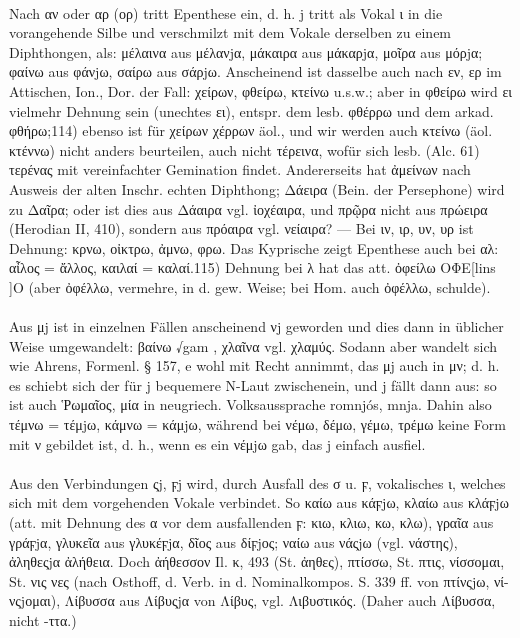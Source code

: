   \paragraph{} Nach αν
  oder αρ (ορ) tritt Epenthese ein, d. h. j tritt als Vokal ι in die
  vorangehende Silbe und verschmilzt mit dem Vokale derselben zu einem
  Diphthongen, als: μέλαινα aus μέλανjα, μάκαιρα aus μάκαρjα, μοῖρα aus μόρjα;
  φαίνω aus φάνjω, σαίρω aus σάρjω. Anscheinend ist dasselbe auch nach εν, ερ im
  Attischen, Ion., Dor. der Fall: χείρων, φθείρω, κτείνω u.s.w.; aber in
  φθείρω wird ει vielmehr Dehnung sein (unechtes ει), entspr. dem lesb. φθέρρω
  und dem arkad. φθήρω;114) ebenso ist für χείρων χέρρων äol., und wir werden
  auch κτείνω (äol. κτέννω) nicht anders beurteilen, auch nicht τέρεινα, wofür
  sich lesb. (Alc. 61) τερένας mit vereinfachter Gemination findet. Andererseits
  hat ἀμείνων nach Ausweis der alten Inschr. echten Diphthong; Δάειρα (Bein. der
  Persephone) wird zu Δαῖρα; oder ist dies aus Δάαιρα vgl. ἰοχέαιρα, und πρῷρα
  nicht aus πρώειρα (Herodian II, 410), sondern aus πρόαιρα vgl. νείαιρα? — Bei
  ιν, ιρ, υν, υρ ist Dehnung: κρνω, οἰκτρω, ἀμνω, φρω. Das Kyprische zeigt
  Epenthese auch bei αλ: αἶλος = ἄλλος, καιλαί = καλαί.115) Dehnung bei λ hat
  das att. ὀφείλω ΟΦΕ[lins ]Ο (aber ὀφέλλω, vermehre, in d. gew. Weise; bei Hom.
  auch ὀφέλλω, schulde). 

  \paragraph{} Aus μj ist in einzelnen Fällen anscheinend νj geworden
  und dies dann in üblicher Weise umgewandelt: βαίνω √gam , χλαῖνα
  vgl. χλαμύς. Sodann aber wandelt sich wie Ahrens, Formenl. § 157, e wohl mit
  Recht annimmt, das μj auch in μν; d. h. es schiebt sich der für j bequemere
  N-Laut zwischenein, und j fällt dann aus: so ist auch Ῥωμαῖος, μία in
  neugriech. Volksaussprache romnjós, mnja. Dahin also τέμνω = τέμjω, κάμνω =
  κάμjω, während bei νέμω, δέμω, γέμω, τρέμω keine Form mit ν gebildet ist, d.
  h., wenn es ein νέμjω gab, das j einfach ausfiel. 

  \paragraph{} Aus den Verbindungen ςj, ϝj
  wird, durch Ausfall des σ u. ϝ, vokalisches ι, welches sich mit dem
  vorgehenden Vokale verbindet. So καίω aus κάϝjω, κλαίω aus κλάϝjω (att. mit
  Dehnung des α vor dem ausfallenden ϝ: κιω, κλιω, κω, κλω), γραῖα aus γράϝjα,
  γλυκεῖα aus γλυκέϝjα, δῖος aus δίϝjος; ναίω aus νάςjω (vgl. νάστης), ἀληθεςjα
  ἀλήθεια. Doch ἀήθεσσον Il. κ, 493 (St. ἀηθες), πτίσσω, St. πτις, νίσσομαι, St.
  νις νες (nach Osthoff, d. Verb. in d. Nominalkompos. S. 339 ff. von πτίνςjω,
  νί-νςjομαι), Λίβυσσα aus Λίβυςjα von Λίβυς, vgl. Λιβυστικός. (Daher auch 
Λίβυσσα, nicht -ττα.) 

